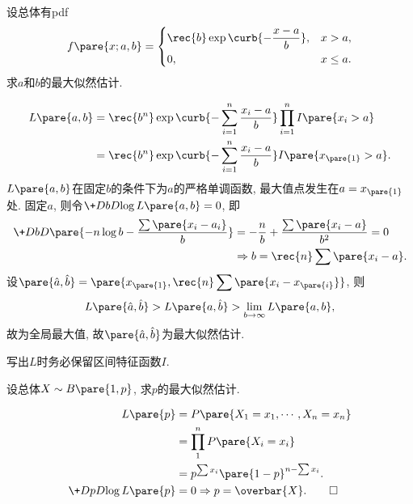 \documentclass{ctexart}
\begin{document}
\begin{sample}
    \begin{ex}
        设总体有pdf
        \[ f\pare{x;a,b} = \left\{\begin{aligned}
            &\rec{b} \exp\curb{- \frac{x-a}{b}}, & x>a, \\
            &0, & x \le a.
        \end{aligned}\right. \]
        求$a$和$b$的最大似然估计.
    \end{ex}
    \begin{solution}
        \begin{align*}
            L\pare{a,b} &= \displaystyle \rec{b^n} \exp\curb{-\sum_{i=1}^n \frac{x_i-a}{b}}\prod_{i=1}^n I\pare{x_i > a} \\
            &= \rec{b^n}  \exp\curb{-\sum_{i=1}^n \frac{x_i-a}{b}} I\pare{x_{\pare{1}} > a}.
        \end{align*}
        $L\pare{a,b}$在固定$b$的条件下为$a$的严格单调函数, 最大值点发生在$a = x_{\pare{1}}$处. 固定$a$, 则令$\displaystyle \+DbD{\log L\pare{a,b}} = 0$, 即
        \begin{align*}
            \+DbD{} \pare{-n\log b - \frac{\sum \pare{x_i - a_i}}{b}} &= -\frac{n}{b} + \frac{\sum\pare{x_i - a}}{b^2} = 0 \\&\Rightarrow b = \rec{n}\sum\pare{x_i - a}.
        \end{align*}
        设$\pare{\hat{a},\hat{b}} = \pare{x_{\pare{1}}, \displaystyle \rec{n} \sum\pare{x_i - x_{\pare{i}}}}$, 则
        \[ L\pare{\hat a, \hat b} > L\pare{a,\hat b} > \lim_{b\rightarrow \infty} L\pare{a,b}, \]
        故为全局最大值, 故$\pare{\hat a, \hat b}$为最大似然估计.
    \end{solution}
\end{sample}
\begin{pitfall}
    写出$L$时务必保留区间特征函数$I$.
\end{pitfall}
\begin{sample}
    \begin{ex}
        设总体$X\sim B\pare{1,p}$, 求$p$的最大似然估计.
    \end{ex}
    \begin{solution}
        \begin{align*}
            L\pare{p} &= P\pare{X_1 = x_1,\cdots, X_n = x_n} \\
            &= \prod_1^n P\pare{X_i = x_i} \\
            &= p^{\sum x_i} \pare{1-p}^{n-\sum x_i}.\\
            \+DpD{\log L\pare{p}} &= 0 \Rightarrow p = \overbar{X}. \qedhere
        \end{align*}
    \end{solution}
\end{sample}
\end{document}
